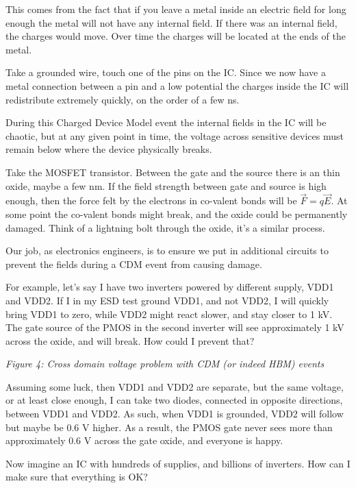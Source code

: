 This comes from the fact that if you leave a metal inside an electric
field for long enough the metal will not have any internal field. If
there was an internal field, the charges would move. Over time the
charges will be located at the ends of the metal.

Take a grounded wire, touch one of the pins on the IC. Since we now have
a metal connection between a pin and a low potential the charges inside
the IC will redistribute extremely quickly, on the order of a few ns.

During this Charged Device Model event the internal fields in the IC
will be chaotic, but at any given point in time, the voltage across
sensitive devices must remain below where the device physically breaks.

Take the MOSFET transistor. Between the gate and the source there is an
thin oxide, maybe a few nm. If the field strength between gate and
source is high enough, then the force felt by the electrons in co-valent
bonds will be \(\vec{F} = q\vec{E}\). At some point the co-valent bonds
might break, and the oxide could be permanently damaged. Think of a
lightning bolt through the oxide, it's a similar process.

Our job, as electronics engineers, is to ensure we put in additional
circuits to prevent the fields during a CDM event from causing damage.

For example, let's say I have two inverters powered by different supply,
VDD1 and VDD2. If I in my ESD test ground VDD1, and not VDD2, I will
quickly bring VDD1 to zero, while VDD2 might react slower, and stay
closer to 1 kV. The gate source of the PMOS in the second inverter will
see approximately 1 kV across the oxide, and will break. How could I
prevent that?


{
\centering
{}
}

\emph{Figure 4: Cross domain voltage problem with CDM (or indeed HBM)
events }

Assuming some luck, then VDD1 and VDD2 are separate, but the same
voltage, or at least close enough, I can take two diodes, connected in
opposite directions, between VDD1 and VDD2. As such, when VDD1 is
grounded, VDD2 will follow but maybe be 0.6 V higher. As a result, the
PMOS gate never sees more than approximately 0.6 V across the gate
oxide, and everyone is happy.

Now imagine an IC with hundreds of supplies, and billions of inverters.
How can I make sure that everything is OK?

